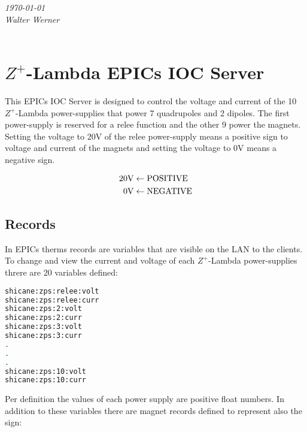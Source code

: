 

\usepackage{amsmath}                %
\usepackage{amsfonts}                %
\usepackage{amssymb}


\usepackage{listings}
\usepackage{ngerman}


\textit{\today}\\
\textit{Walter Werner}
\\
\\


\section*{$Z^+$-Lambda EPICs IOC Server}

This EPICs IOC Server is designed to control the voltage and current of the 10 $Z^+$-Lambda power-supplies that power 7 quadrupoles and 2 dipoles. The first power-supply is reserved for a relee function and the other 9 power the magnets. Setting the voltage to 20V of the relee power-supply means a positive sign to voltage and current of the magnets and setting the voltage to 0V means a negative sign.

\begin{eqnarray}
  20\text{V}&\leftarrow \text{POSITIVE}\notag\\ 
  0 \text{V}&\leftarrow \text{NEGATIVE} \notag
\end{eqnarray}

\subsection*{Records}

In EPICs therms records are variables that are visible on the LAN to the clients. To change and view the current and voltage of each $Z^+$-Lambda power-supplies threre are 20 variables defined:

\begin{lstlisting}[language=bash]
shicane:zps:relee:volt
shicane:zps:relee:curr
shicane:zps:2:volt
shicane:zps:2:curr
shicane:zps:3:volt
shicane:zps:3:curr
.
.
.
shicane:zps:10:volt
shicane:zps:10:curr
\end{lstlisting}

Per definition the values of each power supply are positive float numbers. In addition to these variables there are magnet records defined to represent also the sign:


